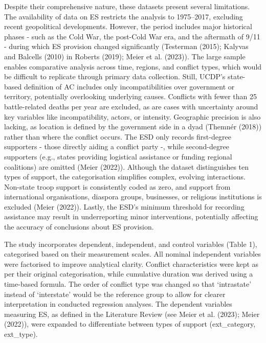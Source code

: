 \documentclass[
]{article}
\begin{document}
Despite their comprehensive nature, these datasets present several
limitations. The availability of data on ES restricts the analysis to
1975--2017, excluding recent geopolitical developments. However, the
period includes major historical phases - such as the Cold War, the
post-Cold War era, and the aftermath of 9/11 - during which ES provision
changed significantly (Testerman (2015); Kalyvas and Balcells (2010) in
Roberts (2019); Meier et al. (2023)). The large sample enables
comparative analysis across time, regions, and conflict types, which
would be difficult to replicate through primary data collection. Still,
UCDP's state-based definition of AC includes only incompatibilities over
government or territory, potentially overlooking underlying causes.
Conflicts with fewer than 25 battle-related deaths per year are
excluded, as are cases with uncertainty around key variables like
incompatibility, actors, or intensity. Geographic precision is also
lacking, as location is defined by the government side in a dyad
(Themnér (2018)) rather than where the conflict occurs. The ESD only
records first-degree supporters - those directly aiding a conflict party
-, while second-degree supporters (e.g., states providing logistical
assistance or funding regional coalitions) are omitted (Meier (2022)).
Although the dataset distinguishes ten types of support, the
categorisation simplifies complex, evolving interactions. Non-state
troop support is consistently coded as zero, and support from
international organisations, diaspora groups, businesses, or religious
institutions is excluded (Meier (2022)). Lastly, the ESD's minimum
threshold for recording assistance may result in underreporting minor
interventions, potentially affecting the accuracy of conclusions about
ES provision.

The study incorporates dependent, independent, and control variables
(Table 1), categorised based on their measurement scales. All nominal
independent variables were factorised to improve analytical clarity.
Conflict characteristics were kept as per their original categorisation,
while cumulative duration was derived using a time-based formula. The
order of conflict type was changed so that `intrastate' instead of
`interstate' would be the reference group to allow for clearer
interpretation in conducted regression analyses. The dependent variables
measuring ES, as defined in the Literature Review (see Meier et al.
(2023); Meier (2022)), were expanded to differentiate between types of
support (ext\_category, ext\_type).
\end{document}
